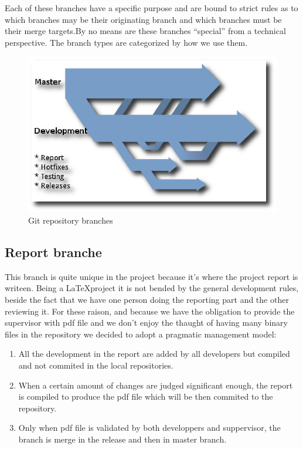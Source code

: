 Each of these branches have a specific purpose and are bound to strict rules as
to which branches may be their originating branch and which branches must be
their merge targets.By no means are these branches “special” from a technical
perspective. The branch types are categorized by how we use them.

\begin{figure}[!htb]
  \begin{center}
    \includegraphics{Figures/Branches.eps}
  \end{center}
  \label{Git repository branches}
  \caption{Git repository branches}
\end{figure}

\subsection{Report branche}
This branch is quite unique in the project because it's where the project report
is writeen. Being a \LaTeX project it is not bended by the general
development rules, beside the fact that we have one person doing the reporting
part and the other reviewing it. For these raison, and because we have the
obligation to provide the supervisor with pdf file and we don't enjoy the
thaught of having many binary files in the repository we decided to adopt a
pragmatic management model:
\begin{enumerate}
  \item All the development in the report are added by all developers but
  compiled and not commited in the local repositories.
  \item When a certain amount of changes are judged significant enough, the
  report is compiled to produce the pdf file which will be then commited to the
  repository.
  \item Only when pdf file is validated by both developpers and suppervisor, the
  branch is merge in the release and then in master branch.
\end{enumerate}

